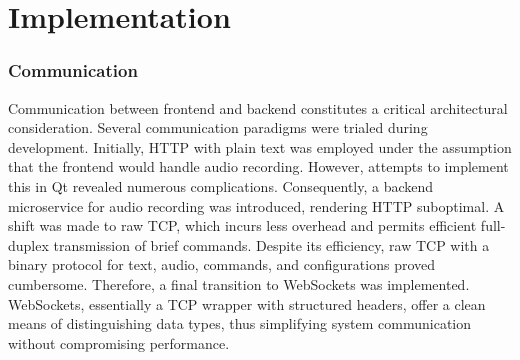 \cleardoubleemptypage
\renewcommand*\chapterpagestyle{scrheadings}

\chapter{Implementation}

\subsection{Communication}
Communication between frontend and backend constitutes a critical architectural consideration.
Several communication paradigms were trialed during development.
Initially, HTTP with plain text was employed under the assumption that the frontend would handle audio recording.
However, attempts to implement this in Qt revealed numerous complications.
Consequently, a backend microservice for audio recording was introduced, rendering HTTP suboptimal.
A shift was made to raw TCP, which incurs less overhead and permits efficient full-duplex transmission of brief commands.
Despite its efficiency, raw TCP with a binary protocol for text, audio, commands, and configurations proved cumbersome.
Therefore, a final transition to WebSockets was implemented.
WebSockets, essentially a TCP wrapper with structured headers, offer a clean means of distinguishing data types,
thus simplifying system communication without compromising performance.

